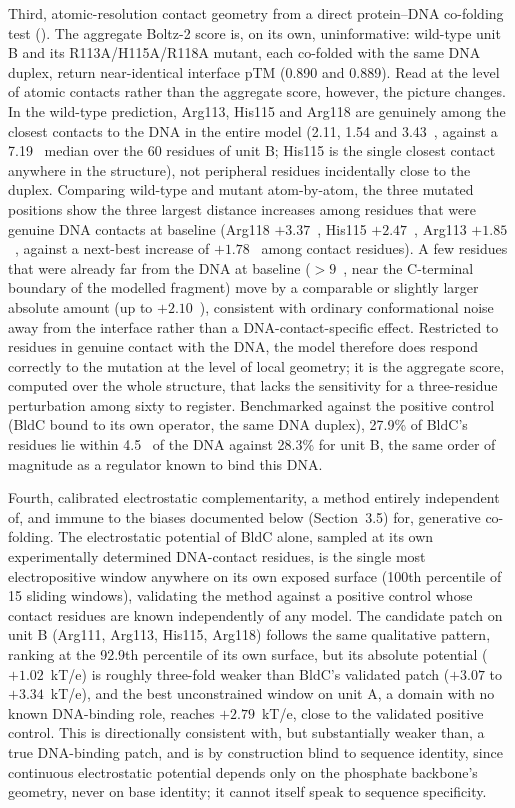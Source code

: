 \documentclass[11pt,a4paper]{article}
\newcommand{\ang}{\text{\AA}}
\begin{document}
Third, atomic-resolution contact geometry from a direct protein--DNA co-folding test
(). The aggregate
Boltz-2 score is, on its own, uninformative: wild-type unit B and its R113A/H115A/R118A mutant,
each co-folded with the same DNA duplex, return near-identical interface pTM (0.890 and 0.889).
Read at the level of atomic contacts rather than the aggregate score, however, the picture changes.
In the wild-type prediction, Arg113, His115 and Arg118 are genuinely among the closest contacts to
the DNA in the entire model (2.11, 1.54 and 3.43~\ang{}, against a 7.19~\ang{} median over the 60
residues of unit B; His115 is the single closest contact anywhere in the structure), not peripheral
residues incidentally close to the duplex. Comparing wild-type and mutant atom-by-atom, the three
mutated positions show the three largest distance increases among residues that were genuine DNA
contacts at baseline (Arg118 $+3.37$~\ang{}, His115 $+2.47$~\ang{}, Arg113 $+1.85$~\ang{}, against a
next-best increase of $+1.78$~\ang{} among contact residues). A few residues that were already far
from the DNA at baseline ($>9$~\ang{}, near the C-terminal boundary of the modelled fragment) move
by a comparable or slightly larger absolute amount (up to $+2.10$~\ang{}), consistent with ordinary
conformational noise away from the interface rather than a DNA-contact-specific effect. Restricted
to residues in genuine contact with the DNA, the model therefore does respond correctly to the
mutation at the level of local geometry; it is the aggregate score, computed over the whole
structure, that lacks the sensitivity for a three-residue perturbation among sixty to register.
Benchmarked against the positive control (BldC bound to its own operator, the same DNA duplex),
27.9\% of BldC's residues lie within 4.5~\ang{} of the DNA against 28.3\% for unit B, the same order
of magnitude as a regulator known to bind this DNA.

Fourth, calibrated electrostatic complementarity, a method entirely independent of, and immune to
the biases documented below (Section~3.5) for, generative co-folding. The electrostatic potential of
BldC alone, sampled at its own experimentally determined DNA-contact residues, is the single most
electropositive window anywhere on its own exposed surface (100th percentile of 15 sliding windows),
validating the method against a positive control whose contact residues are known independently of
any model. The candidate patch on unit B (Arg111, Arg113, His115, Arg118) follows the same
qualitative pattern, ranking at the 92.9th percentile of its own surface, but its absolute potential
($+1.02$~kT/e) is roughly three-fold weaker than BldC's validated patch ($+3.07$ to $+3.34$~kT/e),
and the best unconstrained window on unit A, a domain with no known DNA-binding role, reaches
$+2.79$~kT/e, close to the validated positive control. This is directionally consistent with, but
substantially weaker than, a true DNA-binding patch, and is by construction blind to sequence
identity, since continuous electrostatic potential depends only on the phosphate backbone's
geometry, never on base identity; it cannot itself speak to sequence specificity.
\end{document}
